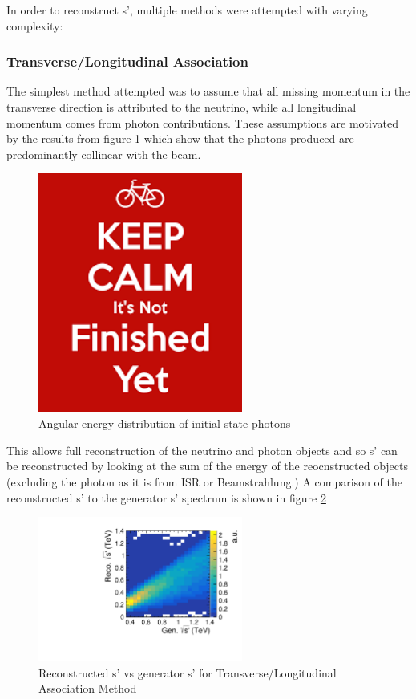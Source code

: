 In order to reconstruct s', multiple methods were attempted with varying complexity:

\subsubsection{Transverse/Longitudinal Association}
The simplest method attempted was to assume that all missing momentum in the transverse direction is attributed to the neutrino, while all longitudinal momentum comes from photon contributions. These assumptions are motivated by the results from figure \ref{fig:photonspectrum} which show that the photons produced are predominantly collinear with the beam.

\begin{figure}
  \centering
  \includegraphics[width=0.6\textwidth]{TopAnalysis/figures/dummy}
  \caption[Angular energy distribution of initial state photons]{Angular energy distribution of initial state photons}
  \label{fig:photonspectrum}
\end{figure}

This allows full reconstruction of the neutrino and photon objects and so s' can be reconstructed by looking at the sum of the energy of the reocnstructed objects (excluding the photon as it is from ISR or Beamstrahlung.) A comparison of the reconstructed s' to the generator s' spectrum is shown in figure \ref{fig:simpleAssoication}

\begin{figure}
  \centering
  \includegraphics[width=0.6\textwidth]{TopAnalysis/figures/CrudeEVsTrueE.pdf}
  \caption[Reconstructed s' vs generator s' for Transverse/Longitudinal Association Method]{Reconstructed s' vs generator s' for Transverse/Longitudinal Association Method}
  \label{fig:simpleAssoication}
\end{figure}

